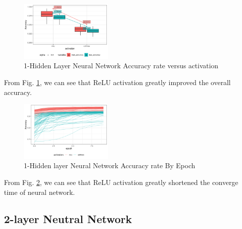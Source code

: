 \documentclass[conference]{IEEEtran}
\begin{document}
\begin{figure}[htbp]
\centerline{\includegraphics[width=0.4\textwidth]{figure/1-Hidden Layer Neural Network Accuracy rate versus activation.png}} 
\caption{1-Hidden Layer Neural Network Accuracy rate versus activation}
\label{1-Hidden Layer Neural Network Accuracy rate versus activation}
\end{figure}
From Fig. \ref{1-Hidden Layer Neural Network Accuracy rate versus activation}, we can see that ReLU activation greatly improved the overall accuracy.
\begin{figure}[htbp]
\centerline{\includegraphics[width=0.4\textwidth]{figure/1-Hidden layer Neural Network Accuracy rate By Epoch.png}}
\caption{1-Hidden layer Neural Network Accuracy rate By Epoch}
\label{1-Hidden layer Neural Network Accuracy rate By Epoch}
\end{figure}
From Fig. \ref{1-Hidden layer Neural Network Accuracy rate By Epoch}, we can see that ReLU activation greatly shortened the converge time of neural network.
















\subsection{2-layer Neutral Network}
\end{document}
